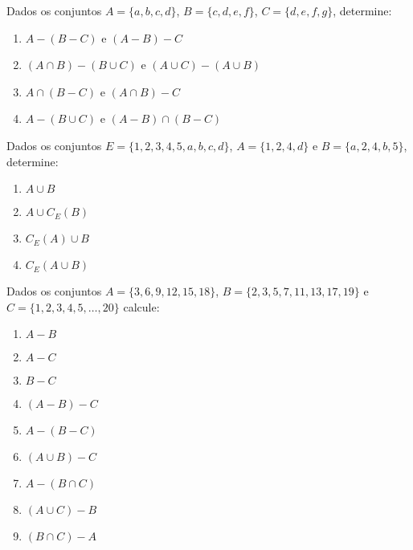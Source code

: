 \documentclass[12pt]{exam}
\begin{document}
    \vspace{.3cm}

    \questao{} Dados os conjuntos $A = \{a, b, c, d\}$, $B = \{c, d, e, f\}$, $C = \{d,       e, f, g\}$, determine:
    \begin{enumerate}[label={\alph*})]
        \item $A - (B - C)$ e $(A - B) - C$

        \item $(A \cap B) - (B \cup C)$ e $(A \cup C) - (A \cup B)$

        \item $A \cap (B - C)$ e $(A \cap B) - C$

        \item $A - (B \cup C)$ e $(A - B) \cap (B - C)$
    \end{enumerate}

    \questao{} Dados os conjuntos $E = \{1,2,3,4,5,a,b,c,d\}$, $A = \{1,2,4,d\}$ e $B =        \{a,2,4,b,5\}$, determine:
    \begin{multicols}{2}
        \begin{enumerate}[label={\alph*})]
            \item $A \cup B$

            \item $A \cup C_E(B)$

            \item $C_E(A) \cup B$

            \item $C_E(A \cup B)$
        \end{enumerate}
    \end{multicols}

    \vspace{.3cm}

    \questao{} Dados os conjuntos $A = \{3,6,9,12,15,18\}$, $B = \{2,3,5,7,11,13,17,19\}      $ e $C = \{1,2,3,4,5,\dots,20\}$ calcule:
    \begin{multicols}{3}
        \begin{enumerate}[label={\alph*})]
            \item $A - B$

            \item $A - C$

            \item $B - C$

            \item $(A - B) - C$

            \item $A - (B - C)$

            \item $(A \cup B) - C$

            \item $A - (B \cap C)$

            \item $(A \cup C) - B$

            \item $(B \cap C) - A$
        \end{enumerate}
    \end{multicols}
\end{document}

